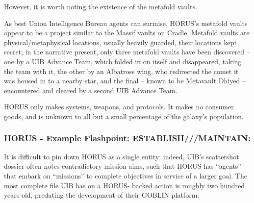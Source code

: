 However, it is worth noting the existence of the metafold vaults.

As best Union Intelligence Bureau agents can surmise, HORUS’s metafold vaults appear to be a
project similar to the Massif vaults on Cradle. Metafold vaults are physical/metaphysical locations,
usually heavily guarded, their locations kept secret; in the narrative present, only three metafold
vaults have been discovered -- one by a UIB Advance Team, which folded in on itself and
disappeared, taking the team with it, the other by an Albatross wing, who redirected the comet it
was housed in to a nearby star, and the final -- known to be Metavault Dhiyed -- encountered and
cleared by a second UIB Advance Team.

HORUS only makes systems, weapons, and protocols. It makes no consumer goods, and is
unknown to all but a small percentage of the galaxy’s population.

\subsubsection[Example Flashpoint: ESTABLISH///MAINTAIN:]{HORUS - Example Flashpoint: ESTABLISH///MAINTAIN:}

It is difficult to pin down HORUS as a single entity: indeed, UIB’s scattershot dossier often notes
contradictory mission aims, such that HORUS has “agents” that embark on “missions” to
complete objectives in service of a larger goal. The most complete file UIB has on a HORUS-
backed action is roughly two hundred years old, predating the development of their GOBLIN
platform:

